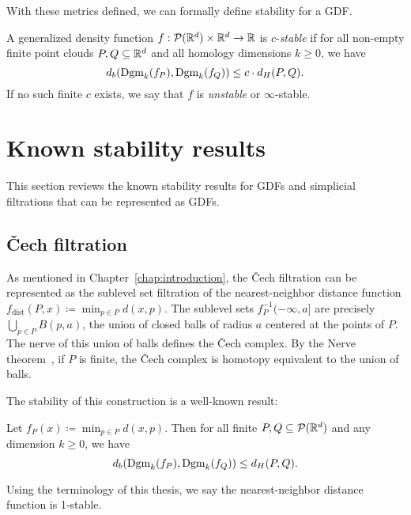 With these metrics defined, we can formally define stability for a GDF.
\begin{definition}
    A generalized density function $f : \mathcal{P}(\mathbb{R}^d) \times \mathbb{R}^d \to \mathbb{R}$ is
    $c$-\emph{stable} if for all non-empty finite point clouds $P, Q \subseteq
    \mathbb{R}^d$ and all homology dimensions $k \geq 0$, we have
    \begin{equation}
        d_b(\operatorname{Dgm}_k(f_P), \operatorname{Dgm}_k(f_Q)) \leq c \cdot d_H(P, Q).
    \end{equation}
    If no such finite $c$ exists, we say that $f$ is \emph{unstable} or
    $\infty$-stable.
\end{definition}

\section{Known stability results}
\label{sec:known_stability_results}

This section reviews the known stability results for GDFs and simplicial
filtrations that can be represented as GDFs.

\subsection{\v{C}ech filtration}
As mentioned in Chapter~\ref{chap:introduction}, the \v{C}ech filtration can be
represented as the sublevel set filtration of the nearest-neighbor distance
function $f_{\mathrm{dist}}(P, x) \coloneqq \min_{p\in P} d(x, p)$.
The sublevel sets $f_P^{-1}(-\infty, a]$ are precisely
$\bigcup_{p\in P} B(p, a)$, the union of closed balls of radius $a$ centered at
the points of $P$. The nerve of this union of balls defines the \v{C}ech
complex. By the Nerve theorem~\cite{Borsuk1948,leray1945forme}, if $P$ is finite,
the \v{C}ech complex is homotopy equivalent to the union of balls.

The stability of this construction is a well-known result:
\begin{theorem}
    Let $f_P(x) \coloneqq \min_{p\in P} d(x, p)$. Then for all finite
    $P, Q \subseteq \mathcal{P}(\mathbb{R}^d)$ and any dimension $k \geq 0$, we have
    \begin{equation}
        d_b(\operatorname{Dgm}_k(f_P), \operatorname{Dgm}_k(f_Q)) \leq d_H(P, Q).
    \end{equation}
\end{theorem}
Using the terminology of this thesis, we say the nearest-neighbor distance
function is 1-stable.

